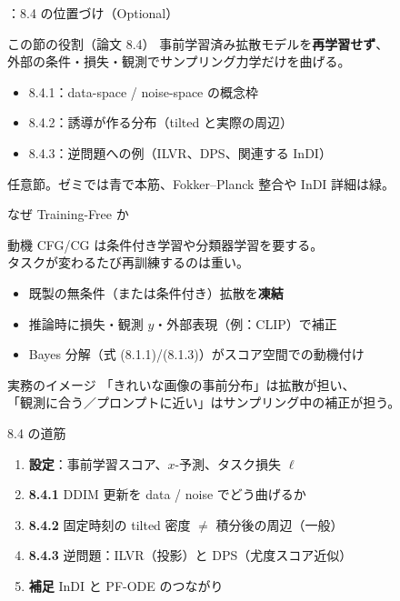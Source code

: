 ﻿%


\assuppl
\begin{frame}{\supplmark：8.4 の位置づけ（Optional）}
    \begin{block}{この節の役割（論文 8.4）}
        事前学習済み拡散モデルを\textbf{再学習せず}、\\
        外部の条件・損失・観測でサンプリング力学だけを曲げる。
    \end{block}
    \begin{itemize}
        \item 8.4.1：data-space / noise-space の概念枠
        \item 8.4.2：誘導が作る分布（tilted と実際の周辺）
        \item 8.4.3：逆問題への例（ILVR、DPS、関連する InDI）
    \end{itemize}
    \vfill
    \footnotesize
    任意節。ゼミでは青で本筋、Fokker--Planck 整合や InDI 詳細は緑。
\end{frame}
\asmain
\begin{frame}{なぜ Training-Free か}
    \begin{block}{動機}
        CFG/CG は条件付き学習や分類器学習を要する。\\
        タスクが変わるたび再訓練するのは重い。
    \end{block}
    \begin{itemize}
        \item 既製の無条件（または条件付き）拡散を\textbf{凍結}
        \item 推論時に損失・観測 $y$・外部表現（例：CLIP）で補正
        \item Bayes 分解（式 (8.1.1)/(8.1.3)）がスコア空間での動機付け
    \end{itemize}
    \begin{exampleblock}{実務のイメージ}
        「きれいな画像の事前分布」は拡散が担い、\\
        「観測に合う／プロンプトに近い」はサンプリング中の補正が担う。
    \end{exampleblock}
\end{frame}
\asmain
\begin{frame}{8.4 の道筋}
    \begin{enumerate}
        \item \textbf{設定}：事前学習スコア、$x$-予測、タスク損失 $\ell$
        \item \textbf{8.4.1} DDIM 更新を data / noise でどう曲げるか
        \item \textbf{8.4.2} 固定時刻の tilted 密度 $\neq$ 積分後の周辺（一般）
        \item \textbf{8.4.3} 逆問題：ILVR（投影）と DPS（尤度スコア近似）
        \item \textbf{補足} InDI と PF-ODE のつながり
    \end{enumerate}
\end{frame}
